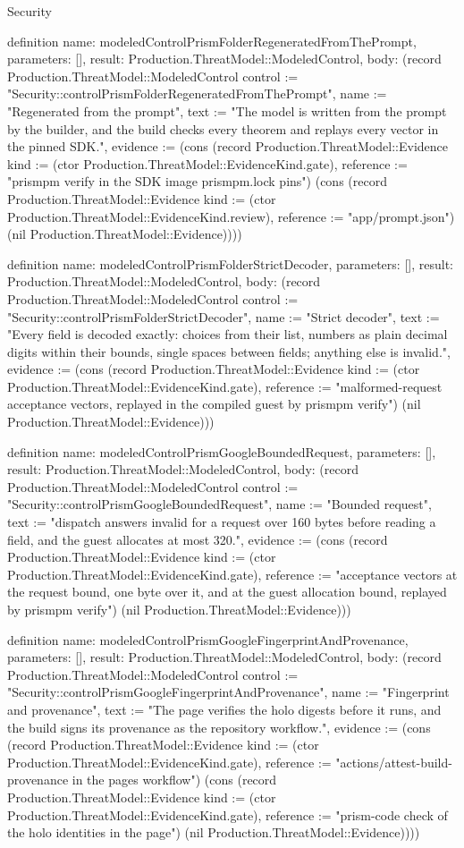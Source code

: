 \begin{lexlean}{Security}
\begin{semanticmodule}
definition{
  name: modeledControlPrismFolderRegeneratedFromThePrompt,
  parameters: [],
  result: Production.ThreatModel::ModeledControl,
  body: (record Production.ThreatModel::ModeledControl {control := "Security::controlPrismFolderRegeneratedFromThePrompt", name := "Regenerated from the prompt", text := "The model is written from the prompt by the builder, and the build checks every theorem and replays every vector in the pinned SDK.", evidence := (cons (record Production.ThreatModel::Evidence {kind := (ctor Production.ThreatModel::EvidenceKind.gate), reference := "prismpm verify in the SDK image prismpm.lock pins"}) (cons (record Production.ThreatModel::Evidence {kind := (ctor Production.ThreatModel::EvidenceKind.review), reference := "app/prompt.json"}) (nil Production.ThreatModel::Evidence)))})
}

definition{
  name: modeledControlPrismFolderStrictDecoder,
  parameters: [],
  result: Production.ThreatModel::ModeledControl,
  body: (record Production.ThreatModel::ModeledControl {control := "Security::controlPrismFolderStrictDecoder", name := "Strict decoder", text := "Every field is decoded exactly: choices from their list, numbers as plain decimal digits within their bounds, single spaces between fields; anything else is invalid.", evidence := (cons (record Production.ThreatModel::Evidence {kind := (ctor Production.ThreatModel::EvidenceKind.gate), reference := "malformed-request acceptance vectors, replayed in the compiled guest by prismpm verify"}) (nil Production.ThreatModel::Evidence))})
}

definition{
  name: modeledControlPrismGoogleBoundedRequest,
  parameters: [],
  result: Production.ThreatModel::ModeledControl,
  body: (record Production.ThreatModel::ModeledControl {control := "Security::controlPrismGoogleBoundedRequest", name := "Bounded request", text := "dispatch answers invalid for a request over 160 bytes before reading a field, and the guest allocates at most 320.", evidence := (cons (record Production.ThreatModel::Evidence {kind := (ctor Production.ThreatModel::EvidenceKind.gate), reference := "acceptance vectors at the request bound, one byte over it, and at the guest allocation bound, replayed by prismpm verify"}) (nil Production.ThreatModel::Evidence))})
}

definition{
  name: modeledControlPrismGoogleFingerprintAndProvenance,
  parameters: [],
  result: Production.ThreatModel::ModeledControl,
  body: (record Production.ThreatModel::ModeledControl {control := "Security::controlPrismGoogleFingerprintAndProvenance", name := "Fingerprint and provenance", text := "The page verifies the holo digests before it runs, and the build signs its provenance as the repository workflow.", evidence := (cons (record Production.ThreatModel::Evidence {kind := (ctor Production.ThreatModel::EvidenceKind.gate), reference := "actions/attest-build-provenance in the pages workflow"}) (cons (record Production.ThreatModel::Evidence {kind := (ctor Production.ThreatModel::EvidenceKind.gate), reference := "prism-code check of the holo identities in the page"}) (nil Production.ThreatModel::Evidence)))})
}


\end{semanticmodule}
\end{lexlean}
